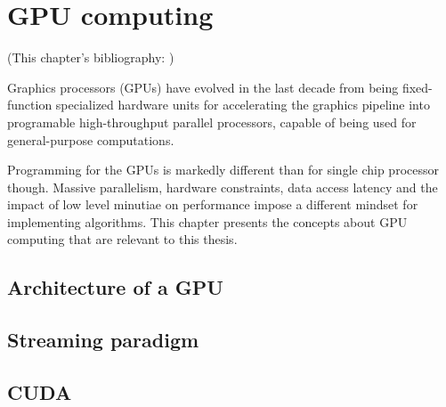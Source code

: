 \chapter{GPU computing}
\label{ch:gpu-computing}

(This chapter's bibliography:
\cite{cudaprog2} \cite{owens08} \cite{jansen07} \cite{lejdfors08}%
)


Graphics processors (GPUs) have evolved in the last decade
from being fixed-function specialized hardware units
for accelerating the graphics pipeline
into programable high-throughput parallel processors,
capable of being used for general-purpose computations.

Programming for the GPUs is markedly different
than for single chip processor though.
Massive parallelism,
hardware constraints,
data access latency and
the impact of low level minutiae on performance
impose a different mindset for implementing algorithms.
This chapter presents the concepts
about GPU computing that are relevant to this thesis.

\section{Architecture of a GPU}

\section{Streaming paradigm}

\section{CUDA}

